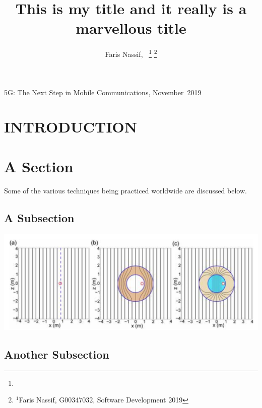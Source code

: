 \documentclass[journal]{IEEEtran}                         %
\begin{document}
%
{5G: The Next Step in Mobile Communications, November~2019}
\title{This is my title and it really is a marvellous title}


\author{Faris Nassif,~%
\thanks{}%
\thanks{$^{1}$Faris Nassif, G00347032, Software Development 2019}%
}

\maketitle


\begin{abstract}

\blindtext 
 
\end{abstract}


\section{INTRODUCTION}

\blindtext 
\blindtext 

\section{A Section}
Some of the various techniques being practiced worldwide are discussed below.


\subsection{A Subsection}
\blindtext 
\blindtext 
\blindtext 

\includegraphics[scale=0.25]{1} 
\Blindtext 



\subsection{Another Subsection}
\blindtext 
\blindtext 
\end{document}
